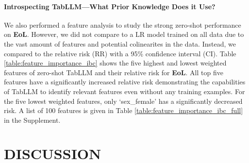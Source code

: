\paragraph{Introspecting TabLLM---What Prior Knowledge Does it Use?} We also performed a feature analysis to study the strong zero-shot performance on \textbf{EoL}.
However, we did not compare to a LR model trained on all data due to the vast amount of features and potential colinearites in the data. Instead, we compared to the relative risk (RR) with a 95\% confidence interval (CI). Table \ref{table:feature_importance_ibc} shows the five highest and lowest weighted features of zero-shot TabLLM and their relative risk for \textbf{EoL}.
All top five features have a significantly increased relative risk demonstrating the capabilities of TabLLM to identify relevant features even without any training examples. For the five lowest weighted features, only `sex\_female' has a significantly decreased risk. A list of 100 features is given in Table \ref{table:feature_importance_ibc_full} in the Supplement.

\section{DISCUSSION}

